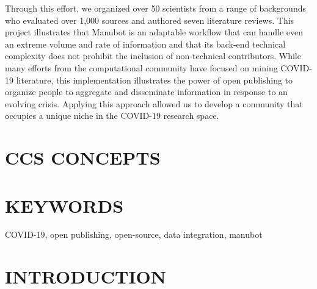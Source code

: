 \documentclass[sigconf]{acmart}
\begin{document}
Through this effort, we organized over 50 scientists from a range of backgrounds who evaluated over 1,000 sources and authored seven literature reviews.
This project illustrates that Manubot is an adaptable workflow that can handle even an extreme volume and rate of information and that its back-end technical complexity does not prohibit the inclusion of non-technical contributors.
While many efforts from the computational community have focused on mining COVID-19 literature, this implementation illustrates the power of open publishing to organize people to aggregate and disseminate information in response to an evolving crisis.
Applying this approach allowed us to develop a community that occupies a unique niche in the COVID-19 research space.

\hypertarget{ccs-concepts}{%
\section{CCS CONCEPTS}\label{ccs-concepts}}

\hypertarget{keywords}{%
\section{KEYWORDS}\label{keywords}}

COVID-19, open publishing, open-source, data integration, manubot

\hypertarget{introduction}{%
\section{INTRODUCTION}\label{introduction}}
\end{document}
